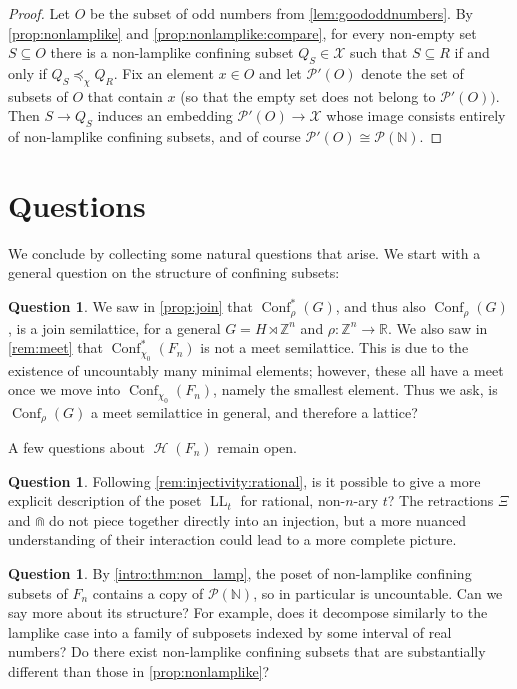 \documentclass[reqno,12pt]{amsart}\setcounter{tocdepth}{1}
\theoremstyle{definition}
\newtheorem{question}[theorem]{Question}
\newcommand{\N}{\mathbb{N}}
\newcommand{\Z}{\mathbb{Z}}
\newcommand{\R}{\mathbb{R}}
\DeclareMathOperator{\Hyp}{\mathcal{H}}
\DeclareMathOperator{\Conf}{Conf}
\DeclareMathOperator{\LL}{LL}
\newcommand{\X}{\mathcal{X}}
\numberwithin{equation}{section}
\begin{document}
\begin{proof}
    Let $O$ be the subset of odd numbers from \cref{lem:goododdnumbers}. By \cref{prop:nonlamplike} and \cref{prop:nonlamplike:compare}, for every non-empty set $S \subseteq O$ there is a non-lamplike confining subset $Q_S \in \X$ such that $S \subseteq R$ if and only if $Q_S \preceq_\chi Q_R$. Fix an element $x \in O$ and let $\mathcal{P}'(O)$ denote the set of subsets of $O$ that contain $x$ (so that the empty set does not belong to $\mathcal{P}'(O))$. Then $S \to Q_S$ induces an embedding $\mathcal{P}'(O) \to \X$ whose image consists entirely of non-lamplike confining subsets, and of course $\mathcal{P}'(O) \cong \mathcal{P}(\N)$.
\end{proof}



\section{Questions}\label{sec:questions}

We conclude by collecting some natural questions that arise. We start with a general question on the structure of confining subsets:

\begin{question}
\label{q:meet}
    We saw in \cref{prop:join} that $\Conf^\ast_\rho(G)$, and thus also $\Conf_\rho(G)$, is a join semilattice, for a general $G = H \rtimes \Z^n$ and $\rho \colon \Z^n \to \R$. We also saw in \cref{rem:meet} that $\Conf^\ast_{\chi_0}(F_n)$ is not a meet semilattice. This is due to the existence of uncountably many minimal elements; however, these all have a meet once we move into $\Conf_{\chi_0}(F_n)$, namely the smallest element. Thus we ask, is $\Conf_\rho(G)$ a meet semilattice in general, and therefore a lattice?
\end{question}

A few questions about $\Hyp(F_n)$ remain open.

\begin{question}
Following \cref{rem:injectivity:rational}, is it possible to give a more explicit description of the poset $\LL_t$ for rational, non-$n$-ary $t$? The retractions $\Xi$ and $\Cap$ do not piece together directly into an injection, but a more nuanced understanding of their interaction could lead to a more complete picture.
\end{question}

\begin{question}
By \cref{intro:thm:non_lamp}, the poset of non-lamplike confining subsets of $F_n$ contains a copy of $\mathcal{P}(\N)$, so in particular is uncountable. Can we say more about its structure? For example, does it decompose similarly to the lamplike case into a family of subposets indexed by some interval of real numbers? Do there exist non-lamplike confining subsets that are substantially different than those in \cref{prop:nonlamplike}?
\end{question}
\end{document}
